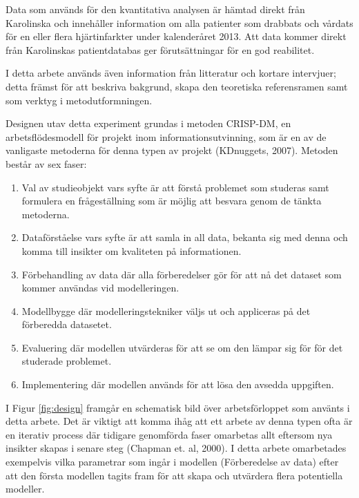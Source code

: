 Data som används för den kvantitativa analysen är hämtad direkt från Karolinska och innehåller information om alla patienter som drabbats och vårdats för en eller flera hjärtinfarkter under kalenderåret 2013. Att data kommer direkt från Karolinskas patientdatabas ger förutsättningar för en god reabilitet.

I detta arbete används även information från litteratur och kortare intervjuer; detta främst för att beskriva bakgrund, skapa den teoretiska referensramen samt som verktyg i metodutformningen.

Designen utav detta experiment grundas i metoden CRISP-DM, en arbetsflödesmodell för projekt inom informationsutvinning, som är en av de vanligaste metoderna för denna typen av projekt (KDnuggets, 2007). Metoden består av sex faser:

\begin{enumerate}
  \item Val av studieobjekt vars syfte är att förstå problemet som studeras samt formulera en frågeställning som är möjlig att besvara genom de tänkta metoderna.
  \item Dataförståelse vars syfte är att samla in all data, bekanta sig med denna och komma till insikter om kvaliteten på informationen.
  \item Förbehandling av data där alla förberedelser gör för att nå det dataset som kommer användas vid modelleringen.
  \item Modellbygge där modelleringstekniker väljs ut och appliceras på det förberedda datasetet.
  \item Evaluering där modellen utvärderas för att se om den lämpar sig för för det studerade problemet.
  \item Implementering där modellen används för att lösa den avsedda uppgiften.
\end{enumerate}

I Figur \ref{fig:design} framgår en schematisk bild över arbetsförloppet som använts i detta arbete. Det är viktigt att komma ihåg att ett arbete av denna typen ofta är en iterativ process där tidigare genomförda faser omarbetas allt eftersom nya insikter skapas i senare steg (Chapman et. al, 2000). I detta arbete omarbetades exempelvis vilka parametrar som ingår i modellen (Förberedelse av data) efter att den första modellen tagits fram för att skapa och utvärdera flera potentiella modeller.

